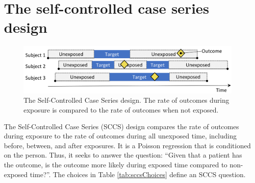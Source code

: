 \documentclass[]{book}
\begin{document}
\hypertarget{the-self-controlled-case-series-design}{%
\section{The self-controlled case series design}\label{the-self-controlled-case-series-design}}


\begin{figure}

{\centering \includegraphics[width=0.9\linewidth]{images/PopulationLevelEstimation/selfControlledCaseSeries} 

}

\caption{The Self-Controlled Case Series design. The rate of outcomes during exposure is compared to the rate of outcomes when not exposed.}\label{fig:selfControlledCaseSeries}
\end{figure}

The Self-Controlled Case Series (SCCS) design \citep{farrington_1995, whitaker_2006} compares the rate of outcomes during exposure to the rate of outcomes during all unexposed time, including before, between, and after exposures. It is a Poisson regression that is conditioned on the person. Thus, it seeks to answer the question: ``Given that a patient has the outcome, is the outcome more likely during exposed time compared to non-exposed time?''. The choices in Table \ref{tab:sccsChoices} define an SCCS question.  
\end{document}
